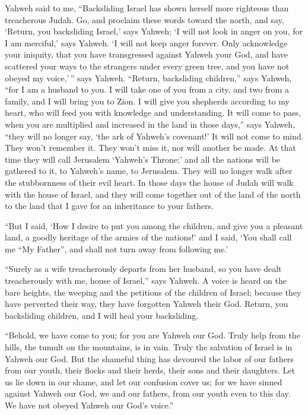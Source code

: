  Yahweh said to me, ``Backsliding Israel has shown herself
more righteous than treacherous Judah.  Go, and proclaim
these words toward the north, and say, `Return, you backsliding Israel,'
says Yahweh; `I will not look in anger on you, for I am merciful,' says
Yahweh. `I will not keep anger forever.  Only acknowledge
your iniquity, that you have transgressed against Yahweh your God, and
have scattered your ways to the strangers under every green tree, and
you have not obeyed my voice,'\,'' says Yahweh.  ``Return,
backsliding children,'' says Yahweh, ``for I am a husband to you. I will
take one of you from a city, and two from a family, and I will bring you
to Zion.  I will give you shepherds according to my heart,
who will feed you with knowledge and understanding.  It
will come to pass, when you are multiplied and increased in the land in
those days,'' says Yahweh, ``they will no longer say, `the ark of
Yahweh's covenant!' It will not come to mind. They won't remember it.
They won't miss it, nor will another be made.  At that time
they will call Jerusalem `Yahweh's Throne;' and all the nations will be
gathered to it, to Yahweh's name, to Jerusalem. They will no longer walk
after the stubbornness of their evil heart.  In those days
the house of Judah will walk with the house of Israel, and they will
come together out of the land of the north to the land that I gave for
an inheritance to your fathers.

 ``But I said, `How I desire to put you among the children,
and give you a pleasant land, a goodly heritage of the armies of the
nations!' and I said, `You shall call me ``My Father'', and shall not
turn away from following me.'

 ``Surely as a wife treacherously departs from her husband,
so you have dealt treacherously with me, house of Israel,'' says Yahweh.
 A voice is heard on the bare heights, the weeping and the
petitions of the children of Israel; because they have perverted their
way, they have forgotten Yahweh their God.  Return, you
backsliding children, and I will heal your backsliding.

``Behold, we have come to you; for you are Yahweh our God. 
Truly help from the hills, the tumult on the mountains, is in vain.
Truly the salvation of Israel is in Yahweh our God.  But
the shameful thing has devoured the labor of our fathers from our youth,
their flocks and their herds, their sons and their daughters.
 Let us lie down in our shame, and let our confusion cover
us; for we have sinned against Yahweh our God, we and our fathers, from
our youth even to this day. We have not obeyed Yahweh our God's voice.''

